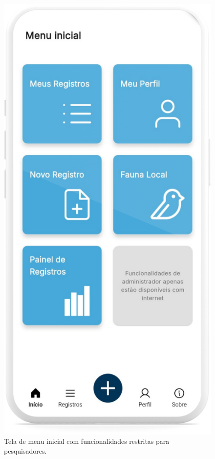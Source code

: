 \begin{figure}[H]
    \centering
    \includegraphics[height=0.72\textheight]{imagens/sistema/device_frame/menuPesquisadorOff.png}
    \caption{Tela de menu inicial com funcionalidades restritas para pesquisadores.}
    \label{fig:menu-pesq-off}
\end{figure}

